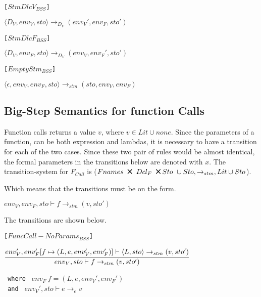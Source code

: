 \texttt{[$StmDlcV_{BSS}$]}\\
\begin{center}
	$\langle D_V, env_V, sto \rangle \rightarrow_{D_V} (env_V', env_F, sto')$
\end{center}

\texttt{[$StmDlcF_{BSS}$]}\\
\begin{center}
	$\langle D_V, env_F, sto \rangle \rightarrow_{D_V} (env_V, env_F', sto')$
\end{center}

\texttt{[$EmptyStm_{BSS}$]}\\
\begin{center}
	\begin{math}
	{\langle \epsilon, env_V, env_F, sto \rangle \rightarrow_{stm} (sto, env_V, env_F)}
	\end{math}
\end{center}

\subsection{Big-Step Semantics for function Calls}
Function calls returns a value $v$, where $v \in Lit \cup {none}$.
Since the parameters of a function, can be both expression and lambdas, it is necessary to have a transition for each of the two cases.
Since these two pair of rules would be almost identical, the formal parameters in the transitions below are denoted with $x$.
The transition-system for $F_{Call}$ is ($Fnames\ \Cross\ Dcl_F\ \Cross Sto\ \cup Sto, \rightarrow_{stm}, Lit \cup Sto$).

Which means that the transitions must be on the form.
\begin{center}
	$env_V, env_F, sto \vdash f \rightarrow_{stm} (v, sto')$
\end{center}
The transitions are shown below.

\texttt{[$FuncCall-NoParams_{BSS}$]}\\
\begin{center}
	\begin{math}
	\cfrac
		{env_V', env_F'[f \mapsto (L, e, env_V', env_F')] \vdash \langle L, sto \rangle \rightarrow_{stm} (v, sto')}
		{env_V, sto \vdash f \rightarrow_{stm} (v, sto')}
	\end{math}
	
	\texttt{ where } $env_F\ f = (L, e, env_V', env_F')$\\
	\texttt{ and } $ env_V', sto \vdash e \rightarrow_{e} v$\\
\end{center}

